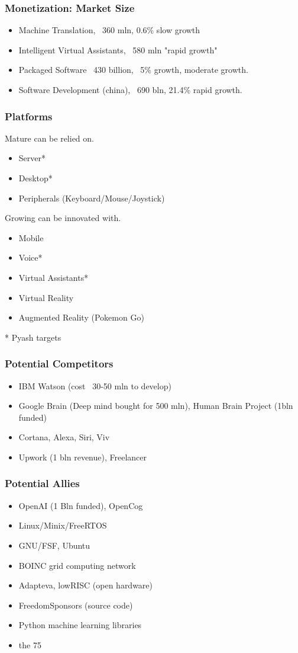 \documentclass{beamer}
\begin{document}
\begin{frame}
  \frametitle{Monetization: Market Size}
  \begin{itemize}
    \item Machine Translation, ~360 mln, 0.6\% slow growth
    \item Intelligent Virtual Assistants, ~580 mln "rapid growth"
    \item Packaged Software ~430 billion, ~5\% growth, moderate growth.
    \item Software Development (china), ~690 bln, 21.4\% rapid growth.
  \end{itemize}
\end{frame}

\begin{frame}
  \frametitle{Platforms}
  Mature can be relied on. 
  \begin{itemize}
    \item Server*
    \item Desktop*
    \item Peripherals (Keyboard/Mouse/Joystick)
  \end{itemize}
  Growing can be innovated with. 
  \begin{itemize}
    \item Mobile
    \item Voice*
    \item Virtual Assistants*
    \item Virtual Reality
    \item Augmented Reality (Pokemon Go)
  \end{itemize}
  * Pyash targets
\end{frame}

\begin{frame}
\frametitle{Potential Competitors}
  \begin{itemize}
    \item IBM Watson (cost ~30-50 mln to develop)
    \item Google Brain (Deep mind bought for 500 mln), 
            Human Brain Project (1bln funded)
    \item Cortana, Alexa, Siri, Viv
    \item Upwork (1 bln revenue), Freelancer
  \end{itemize}
\end{frame}

\begin{frame}
\frametitle{Potential Allies}
  \begin{itemize}
    \item OpenAI (1 Bln funded), OpenCog
    \item Linux/Minix/FreeRTOS
    \item GNU/FSF, Ubuntu
    \item BOINC grid computing network
    \item Adapteva, lowRISC (open hardware)
    \item FreedomSponsors (source code)
    \item Python machine learning libraries
    \item the 75%
  \end{itemize}
\end{frame}
\end{document}
